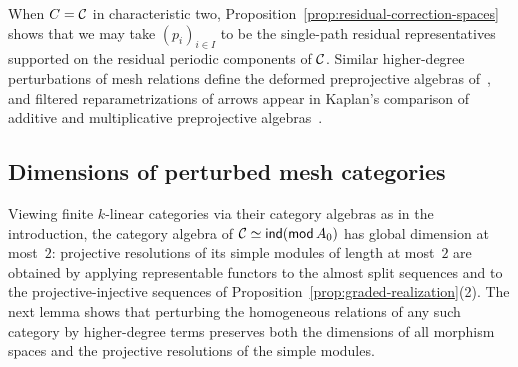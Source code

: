 When $C=\mathcal C$ in characteristic two, Proposition~\ref{prop:residual-correction-spaces} shows that we may take $(p_i)_{i\in I}$ to be the single-path residual representatives supported on the residual periodic components of $\mathcal C$. Similar higher-degree perturbations of mesh relations define the deformed preprojective algebras of~\cite{BES}, and filtered reparametrizations of arrows appear in Kaplan's comparison of additive and multiplicative preprojective algebras~\cite[Lemma~3.8]{Kaplan}.

\subsection{Dimensions of perturbed mesh categories}

Viewing finite $k$-linear categories via their category algebras as in the introduction, the category algebra of $\mathcal C\simeq\operatorname{\mathsf{ind}}(\operatorname{\mathsf{mod}} A_0)$ has global dimension at most~$2$: projective resolutions of its simple modules of length at most~$2$ are obtained by applying representable functors to the almost split sequences and to the projective-injective sequences of Proposition~\ref{prop:graded-realization}(2). The next lemma shows that perturbing the homogeneous relations of any such category by higher-degree terms preserves both the dimensions of all morphism spaces and the projective resolutions of the simple modules.

